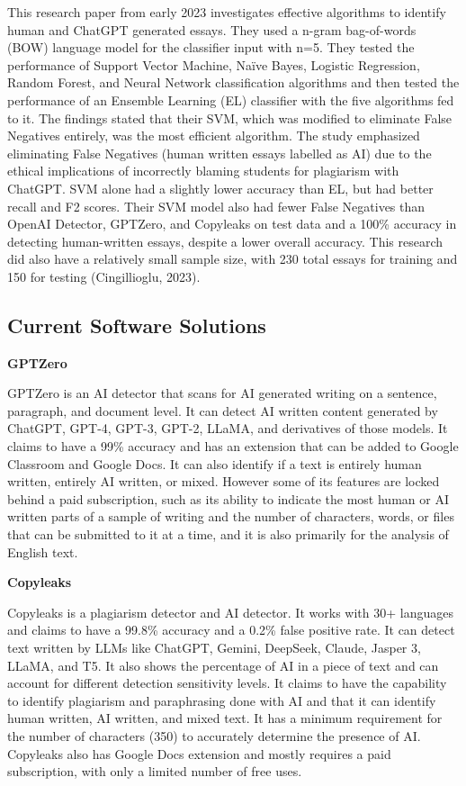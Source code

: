 \documentclass{article} %
\begin{document}
This research paper from early 2023 investigates effective algorithms to identify human and ChatGPT generated essays. They used a n-gram bag-of-words (BOW) language model for the classifier input with n=5. They tested the performance of Support Vector Machine, Naïve Bayes, Logistic Regression, Random Forest, and Neural Network classification algorithms and then tested the performance of an Ensemble Learning (EL) classifier with the five algorithms fed to it. The findings stated that their SVM, which was modified to eliminate False Negatives entirely, was the most efficient algorithm. The study emphasized eliminating False Negatives (human written essays labelled as AI) due to the ethical implications of incorrectly blaming students for plagiarism with ChatGPT. SVM alone had a slightly lower accuracy than EL, but had better recall and F2 scores. Their SVM model also had fewer False Negatives than OpenAI Detector, GPTZero, and Copyleaks on test data and a 100\% accuracy in detecting human-written essays, despite a lower overall accuracy. This research did also have a relatively small sample size, with 230 total essays for training and 150 for testing (Cingillioglu, 2023).

\subsection{Current Software Solutions}

\textbf{GPTZero}

GPTZero is an AI detector that scans for AI generated writing on a sentence, paragraph, and document level. It can detect AI written content generated by ChatGPT, GPT-4, GPT-3, GPT-2, LLaMA, and derivatives of those models. It claims to have a 99\% accuracy and has an extension that can be added to Google Classroom and Google Docs. It can also identify if a text is entirely human written, entirely AI written, or mixed. However some of its features are locked behind a paid subscription, such as its ability to indicate the most human or AI written parts of a sample of writing and the number of characters, words, or files that can be submitted to it at a time, and it is also primarily for the analysis of English text.

\textbf{Copyleaks}

Copyleaks is a plagiarism detector and AI detector. It works with 30+ languages and claims to have a 99.8\% accuracy and a 0.2\% false positive rate. It can detect text written by LLMs like ChatGPT, Gemini, DeepSeek, Claude, Jasper 3, LLaMA, and T5. It also shows the percentage of AI in a piece of text and can account for different detection sensitivity levels. It claims to have the capability to identify plagiarism and paraphrasing done with AI and that it can identify human written, AI written, and mixed text. It has a minimum requirement for the number of characters (350) to accurately determine the presence of AI. Copyleaks also has Google Docs extension and mostly requires a paid subscription, with only a limited number of free uses.
\end{document}
